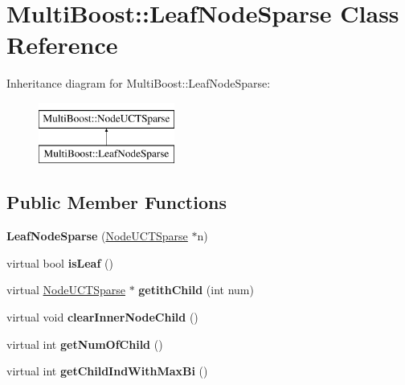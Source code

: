 \hypertarget{classMultiBoost_1_1LeafNodeSparse}{\section{Multi\-Boost\-:\-:Leaf\-Node\-Sparse Class Reference}
\label{classMultiBoost_1_1LeafNodeSparse}
}
Inheritance diagram for Multi\-Boost\-:\-:Leaf\-Node\-Sparse\-:\begin{figure}[H]
\begin{center}
\leavevmode
\includegraphics[height=2.000000cm]{classMultiBoost_1_1LeafNodeSparse}
\end{center}
\end{figure}
\subsection*{Public Member Functions}
\begin{DoxyCompactItemize}
\item 
\hypertarget{classMultiBoost_1_1LeafNodeSparse_a0f6230f2790d0fbf138f47847144934c}{{\bfseries Leaf\-Node\-Sparse} (\hyperlink{classMultiBoost_1_1NodeUCTSparse}{Node\-U\-C\-T\-Sparse} $\ast$n)}\label{classMultiBoost_1_1LeafNodeSparse_a0f6230f2790d0fbf138f47847144934c}

\item 
\hypertarget{classMultiBoost_1_1LeafNodeSparse_a3c43c42444bb5d98c180dd73046cd9c2}{virtual bool {\bfseries is\-Leaf} ()}\label{classMultiBoost_1_1LeafNodeSparse_a3c43c42444bb5d98c180dd73046cd9c2}

\item 
\hypertarget{classMultiBoost_1_1LeafNodeSparse_a2217389896d7d05bf01b26d0ca5d89de}{virtual \hyperlink{classMultiBoost_1_1NodeUCTSparse}{Node\-U\-C\-T\-Sparse} $\ast$ {\bfseries getith\-Child} (int num)}\label{classMultiBoost_1_1LeafNodeSparse_a2217389896d7d05bf01b26d0ca5d89de}

\item 
\hypertarget{classMultiBoost_1_1LeafNodeSparse_a497746b8d995828b149138b578742ef5}{virtual void {\bfseries clear\-Inner\-Node\-Child} ()}\label{classMultiBoost_1_1LeafNodeSparse_a497746b8d995828b149138b578742ef5}

\item 
\hypertarget{classMultiBoost_1_1LeafNodeSparse_a7debf95f7d215bb43bddbf13f235686f}{virtual int {\bfseries get\-Num\-Of\-Child} ()}\label{classMultiBoost_1_1LeafNodeSparse_a7debf95f7d215bb43bddbf13f235686f}

\item 
\hypertarget{classMultiBoost_1_1LeafNodeSparse_a79c0ad0990b997f75b36b60daae22a1d}{virtual int {\bfseries get\-Child\-Ind\-With\-Max\-Bi} ()}\label{classMultiBoost_1_1LeafNodeSparse_a79c0ad0990b997f75b36b60daae22a1d}

\end{DoxyCompactItemize}
